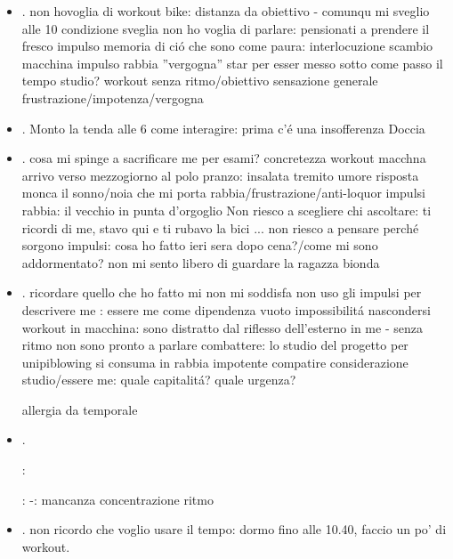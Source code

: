 \begin{itemize}
cosa \'e questo tempo??
non riesco a trovare il ritmo-perdo tempo:confusione
(ascoltarmi prima di agire: ci vorrebbe un retino ...: guardare ragazzi che tentano di prendere bottiglieq)
\item {}.
non hovoglia di workout bike: distanza da obiettivo - comunqu mi sveglio alle 10
condizione sveglia non ho voglia di parlare: pensionati a prendere il fresco
impulso memoria di ci\'o che sono come paura: interlocuzione scambio macchina
impulso rabbia ''vergogna'' star per esser messo sotto
come passo il tempo studio?
workout senza ritmo/obiettivo
sensazione generale frustrazione/impotenza/vergogna
\item {}.
Monto la tenda alle 6
come interagire: prima c'\'e una insofferenza
Doccia
\item {}.
cosa mi spinge a sacrificare me per esami?
concretezza workout macchna
arrivo verso mezzogiorno al polo
pranzo: insalata tremito umore risposta monca
il sonno/noia che mi porta rabbia/frustrazione/anti-loquor
impulsi rabbia: il vecchio in punta d'orgoglio
Non riesco a scegliere chi ascoltare: ti ricordi di me, stavo qui e ti rubavo la bici ...
non riesco a pensare perch\'e sorgono impulsi: cosa ho fatto ieri sera dopo cena?/come mi sono addormentato?
non mi sento libero di guardare la ragazza bionda
\item {}.
ricordare quello che ho fatto mi non mi soddisfa
non uso gli impulsi per descrivere me
: essere me come dipendenza vuoto impossibilit\'a nascondersi
workout in macchina: sono distratto dal riflesso dell'esterno in me - senza ritmo
non sono pronto a parlare combattere: lo studio del progetto per unipiblowing si consuma in rabbia impotente compatire considerazione 
studio/essere me: quale capitalit\'a? quale urgenza?

allergia da temporale
\item {}.

:

: -: mancanza concentrazione ritmo


\item {}.
non ricordo che voglio usare il tempo: dormo fino alle 10.40, faccio un po' di workout.


\end{itemize}
